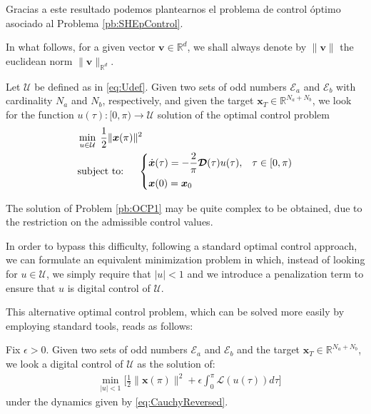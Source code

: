Gracias a este resultado podemos plantearnos el problema de control óptimo asociado al Problema \ref{pb:SHEpControl}.


In what follows, for a given vector $\bm{v}\in\mathbb{R}^d$, we shall always denote by $\|\bm{v}\|$ the euclidean norm $\|\bm{v}\|_{\mathbb{R}^d}$.
\newline


\begin{problem}\label{pb:OCP1}
Let $\mathcal U$ be defined as in \eqref{eq:Udef}. Given two sets of odd numbers $\mathcal {E}_a $ and $\mathcal {E}_b $ with cardinality $N_a$ and $N_b$, respectively, and given the target $\bm{x}_T\in \mathbb{R}^{N_a+N_b}$, we look for the function $u(\tau):[0,\pi)\to \mathcal U$ solution of the optimal control problem  
\begin{align*}
	&\min_{u \in \mathcal{U}}\;\frac 12 \|\bm{x}(\pi)\|^2
	\\
    &\notag \text{subject to: }\quad \begin{cases}
            \displaystyle \dot{\bm{x}}(\tau) = -\frac 2\pi\bm{\mathcal{D}}(\tau) u(\tau),  & \tau \in [0,\pi)\\[6pt]
            \bm{x}(0) = \bm{x}_0
    \end{cases}
    \end{align*}
\end{problem}
The solution of Problem \ref{pb:OCP1} may be quite complex to be obtained, due to the restriction on the admissible control values. 

In order to bypass this difficulty, following a standard optimal control approach, we can formulate an equivalent minimization problem in which, instead of looking for $u\in\mathcal U$, we simply require that $|u|<1$ and we introduce a penalization term to ensure that $u$ is digital control of $\mathcal{U}$.


%
This alternative optimal control problem, which can be solved more easily by employing standard tools, reads as follows:
\newline
\begin{problem}\label{pb:OCP_penalizado}
Fix $\epsilon>0$. Given two sets of odd numbers $\mathcal E_a $ and $\mathcal E_b $ and the target $\bm{x}_T \in \mathbb {R}^{N_a + N_b}$, we look a digital control of $\mathcal{U}$ as the solution of:
\begin{align*}
	&\min_{|u|<1} \Bigg[\frac 12 \|\bm{x}(\pi) \|^2+ \epsilon \int_0^{\pi} \mathcal{L}(u(\tau)) d\tau \Bigg]  
\end{align*}
under the dynamics given by \eqref{eq:CauchyReversed}.
\end{problem}

